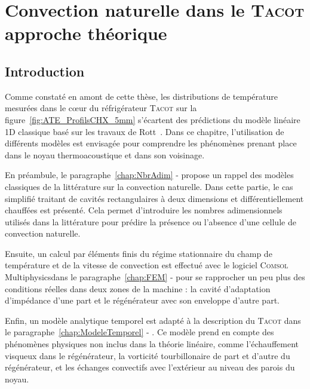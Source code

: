 \chapter[Convection naturelle dans le \textsc{Tacot} -- approche théorique]{Convection naturelle dans le \textsc{Tacot}\\approche théorique}\label{chap:SimusRealisees}
\mylocaltoc

\section{Introduction}
Comme constaté en amont de cette thèse, les distributions de température mesurées dans le c\oe{}ur du réfrigérateur \textsc{Tacot} sur la figure~\ref{fig:ATE_ProfilsCHX_5mm} s'écartent des prédictions du modèle linéaire 1D classique basé sur les travaux de Rott~\cite{rott_thermoacoustics_1980}. Dans ce chapitre, l'utilisation de différents modèles est envisagée pour comprendre les phénomènes prenant place dans le noyau thermoacoustique et dans son voisinage.\medskip

En préambule, le paragraphe~\ref{chap:NbrAdim} -  propose un rappel des modèles classiques de la littérature sur la convection naturelle. Dans cette partie, le cas simplifié traitant de cavités rectangulaires à deux dimensions et différentiellement chauffées est présenté. Cela permet d'introduire les nombres adimensionnels utilisés dans la littérature pour prédire la présence ou l'absence d'une cellule de convection naturelle.\smallskip

Ensuite, un calcul par éléments finis du régime stationnaire du champ de température et de la vitesse de convection est effectué avec le logiciel \textsc{Comsol} Multiphysics\textss\textregistered dans le paragraphe~\ref{chap:FEM} -  pour se rapprocher un peu plus des conditions réelles dans deux zones de la machine : la cavité d'adaptation d'impédance d'une part et le régénérateur avec son enveloppe d'autre part.\smallskip

Enfin, un modèle analytique temporel est adapté à la description du \textsc{Tacot} dans le paragraphe~\ref{chap:ModeleTemporel} - . Ce modèle prend en compte des phénomènes physiques non inclus dans la théorie linéaire, comme l'échauffement visqueux dans le régénérateur, la vorticité tourbillonaire de part et d'autre du régénérateur, et les échanges convectifs avec l'extérieur au niveau des parois du noyau.

